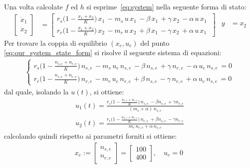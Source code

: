\documentclass[a4paper, 11pt]{article}
\begin{document}
Una volta calcolate $f$ ed $h$ si esprime~\eqref{eq:system} nella seguente forma di stato:
%
\begin{subequations}\label{eq:our_system_state_form}
\begin{align}
	\begin{bmatrix}
		\dot{x}_1
		\\
		\dot{x}_2
	\end{bmatrix} &= \begin{bmatrix}
	r_s \bigl(1-\frac{x_1+x_2}{K}\bigr)\, x_1\, -m_s\, u\, x_1\, -\beta\, x_1\, +\gamma\, x_2\, -\alpha\, u\, x_1\ 
	\\
	r_r \bigl(1-\frac{x_1+x_2 }{K}\bigr)\, x_2\, -m_r\, u\, x_2\, +\beta\, x_1\, -\gamma\, x_2\, +\alpha\, u\, x_1\ 
\end{bmatrix} \label{eq:state_form_1}
\end{align}
\begin{align}
	y &= x_2
\end{align}
\end{subequations}
%
Per trovare la coppia di equilibrio $(x_e, u_e)$ del punto \eqref{eq:our_system_state_form} si risolve il seguente sistema di equazioni:
%
\begin{align}
	\begin{cases}
		r_s \bigl(1-\frac{n_{s,e}+n_{r,e}}{K}\bigr)\, n_{s,e}\, -m_s\, u_e\, n_{s,e}\, -\beta\, n_{s,e}\, +\gamma\, n_{r,e}\, -\alpha\, u_e\, n_{s,e}\, =0
		\\
		r_r \bigl(1-\frac{n_{s,e}+n_{r,e}}{K}\bigr)\, n_{r,e}\, -m_r\, u_e\, n_{r,e}\, +\beta\, n_{s,e}\, -\gamma\, n_{r,e}\, +\alpha\, u_e\, n_{s,e}\, =0
	\end{cases}
\end{align}
%
dal quale, isolando la $u(t)$, si ottiene:
%
\begin{subequations}
\begin{align}
	u_1(t)=\frac{r_s \bigl(1-\frac{n_{s,e}+n_{r,e}}{K}\bigr)\, n_{s,e}\,-\beta n_{s,e}\,+\gamma n_{r,e}}{(m_s+\alpha)\,n_{s,e}} 
	\\
	u_2(t)=\frac{r_r \bigl(1-\frac{n_{s,e}+n_{r,e}}{K}\bigr)\, n_{r,e}\,+\beta n_{s,e}\,-\gamma n_{r,e}}{m_r\,n_{r,e}+\alpha\,n_{s,e}}
\end{align}
\end{subequations}
%
calcolando quindi rispetto ai parametri forniti si ottiene:
%
\begin{align}
	x_e :=\begin{bmatrix}
		n_{s,e}
		\\
		n_{r,e}
	\end{bmatrix} = 
	\begin{bmatrix}
		100
		\\
		400
	\end{bmatrix},  \quad u_e = 0 \
	\label{eq:equilibirum_pair}
\end{align}
\end{document}
